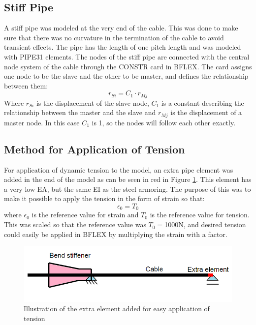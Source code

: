 \subsection{Stiff Pipe}
A stiff pipe was modeled at the very end of the cable. This was done to make sure that there was no curvature in the termination of the cable to avoid transient effects. The pipe has the length of one pitch length and was modeled with PIPE31 elements. The nodes of the stiff pipe are connected with the central node system of the cable through the CONSTR card in BFLEX. The card assigns one node to be the slave and the other to be master, and defines the relationship between them:
\begin{equation}
r_{Si}=C_1 \cdot r_{Mj}    
\end{equation}
Where $r_{Si}$ is the displacement of the slave node,  $C_1$ is a constant describing the relationship between the master and the slave and $r_{Mj}$ is the displacement of a master node.\newline 
\newline 
In this case $C_1$ is 1, so the nodes will follow each other exactly. 

\subsection{Method for Application of Tension}
\noindent For application of dynamic tension to the model, an extra pipe element was added in the end of the model as can be seen in red in Figure \ref{fig:exelem}. This element has a very low EA, but the same EI as the steel armoring. The purpose of this was to make it possible to apply the tension in the form of strain so that:
\begin{equation}
    \epsilon_0 = T_0
\end{equation}
where $\epsilon_0$ is the reference value for strain and $T_0$ is the reference value for tension. This was scaled so that the reference value was $T_0=$1000N, and desired tension could easily be applied in BFLEX by multiplying the strain with a factor. 
\begin{figure}[H]
\centering
\includegraphics[scale=0.8]{figures/exelem}
\caption[Illustration of the extra element added for easy application of tension]{Illustration of the extra element added for easy application of tension}
 \label{fig:exelem}
\end{figure}


